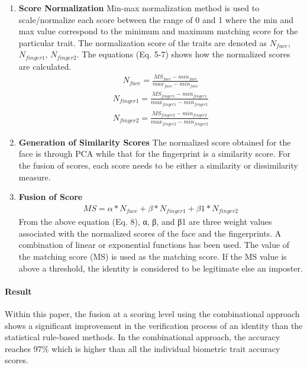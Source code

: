 \documentclass[a4paper, 12pt]{article}
\begin{document}
\begin{enumerate}
    \item \textbf{Score Normalization} \vskip 0.05in \noindent Min-max normalization method is used to scale/normalize each score between the range of 0 and 1 where the min and max value correspond to the minimum and maximum matching score for the particular trait. The normalization score of the traits are denoted as $N_{face}$, $N_{finger1}$, $N_{finger2}$. The equations (Eq. 5-7) shows how the normalized scores are calculated. \begin{align}
        N_{face} = \frac{MS_{face} - min_{face}}{max_{face} - min_{face}}
    \end{align}
    \begin{align}
        N_{finger1} = \frac{MS_{finger1} - min_{finger1}}{max_{finger1} - min_{finger1}}
    \end{align}
    \begin{align}
        N_{finger2} = \frac{MS_{finger2} - min_{finger2}}{max_{finger2} - min_{finger2}}
    \end{align}
    \item \textbf{Generation of Similarity Scores} \vskip 0.05in \noindent The normalized score obtained for the face is through PCA while that for the fingerprint is a similarity score. For the fusion of scores, each score needs to be either a similarity or dissimilarity measure.
    \item \textbf{Fusion of Score}
    \begin{align}
        MS = \alpha * N_{face} + \beta * N_{finger1} + \beta\textit{1} * N_{finger2}
    \end{align} \noindent From the above equation (Eq. 8), α, β, and β1 are three weight values associated with the normalized scores of the face and the fingerprints. A combination of linear or exponential functions has been used. The value of the matching score (MS) is used as the matching score. If the MS value is above a threshold, the identity is considered to be legitimate else an imposter.
\end{enumerate}
\noindent\paragraph{Result} 
\noindent Within this paper, the fusion at a scoring level using the combinational approach shows a significant improvement in the verification process of an identity than the statistical rule-based methods. In the combinational approach, the accuracy reaches 97\% which is higher than all the individual biometric trait accuracy scores.
\vskip 0.2in
\end{document}
